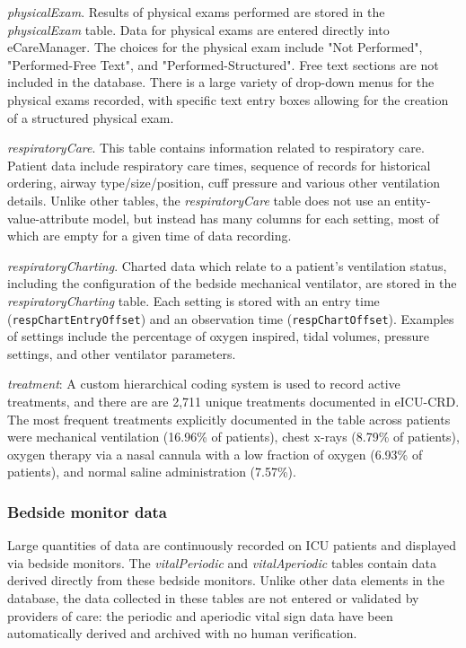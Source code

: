 \documentclass[english]{article}
\newcommand{\colname}[1]{\texttt{#1}}
\newcommand{\tblname}[1]{\emph{#1}}
\begin{document}
\tblname{physicalExam}. Results of physical exams performed are stored in the \tblname{physicalExam} table. Data for physical exams are entered directly into eCareManager. The choices for the physical exam include "Not Performed", "Performed-Free Text", and "Performed-Structured". Free text sections are not included in the database. There is a large variety of drop-down menus for the physical exams recorded, with specific text entry boxes allowing for the creation of a structured physical exam.

\tblname{respiratoryCare}. This table contains information related to respiratory care. Patient data include respiratory care times, sequence of records for historical ordering, airway type/size/position, cuff pressure and various other ventilation details. Unlike other tables, the \tblname{respiratoryCare} table does not use an entity-value-attribute model, but instead has many columns for each setting, most of which are empty for a given time of data recording.

\tblname{respiratoryCharting}. Charted data which relate to a patient's ventilation status, including the configuration of the bedside mechanical ventilator, are stored in the \tblname{respiratoryCharting} table.
Each setting is stored with an entry time (\colname{respChartEntryOffset}) and an observation time (\colname{respChartOffset}).
Examples of settings include the percentage of oxygen inspired, tidal volumes, pressure settings, and other ventilator parameters.

\tblname{treatment}: A custom hierarchical coding system is used to record
active treatments, and there are are 2,711 unique treatments documented
in eICU-CRD. The most frequent treatments explicitly documented in the table
across patients were mechanical ventilation (16.96\% of patients), chest
x-rays (8.79\% of patients), oxygen therapy via a nasal cannula with a
low fraction of oxygen (6.93\% of patients), and normal saline
administration (7.57\%).

\subsubsection*{Bedside monitor data}\label{monitor-data}

Large quantities of data are continuously recorded on ICU patients and
displayed via bedside monitors. The \tblname{vitalPeriodic} and
\tblname{vitalAperiodic} tables contain data derived directly from these
bedside monitors.
Unlike other data elements in the database, the data collected in these tables are not entered or validated by providers of care: the periodic and aperiodic vital sign data have been automatically derived and archived with no human verification.
\end{document}
